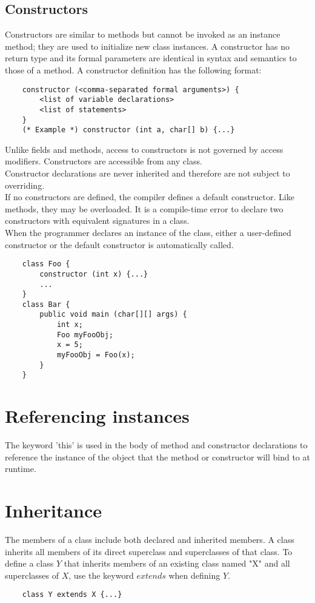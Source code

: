 \begin{homeworkProblem}
	\subsection{Constructors}
	Constructors are similar to methods but cannot be invoked as an instance method; they are used to initialize new class instances. A constructor has no return type and its formal parameters are identical in syntax and semantics to those of a method. A constructor definition has the following format:
	\begin{verbatim}
	constructor (<comma-separated formal arguments>) {
		<list of variable declarations>
		<list of statements>
	}
	(* Example *) constructor (int a, char[] b) {...}
	\end{verbatim}

	Unlike fields and methods, access to constructors is not governed by access modifiers. Constructors are accessible from any class.\\
	
	Constructor declarations are never inherited and therefore are not subject to overriding.\\
	
	If no constructors are defined, the compiler defines a default constructor. Like methods, they may be overloaded. It is a compile-time error to declare two constructors with equivalent signatures in a class.\\
	
	When the programmer declares an instance of the class, either a user-defined constructor or the default constructor is automatically called.
	\begin{verbatim}
	class Foo {
		constructor (int x) {...}
		...
	}
	class Bar {
		public void main (char[][] args) {
			int x; 
			Foo myFooObj;
			x = 5;
			myFooObj = Foo(x);
		}
	}
	\end{verbatim}
	
	\section{Referencing instances}
	The keyword 'this' is used in the body of method and constructor declarations to reference the instance of the object that the method or constructor will bind to at runtime.
	
	\section{Inheritance}
	The members of a class include both declared and inherited members. A class inherits all members of its direct superclass and superclasses of that class. To define a class $Y$ that inherits members of an existing class named "X" and all superclasses of $X$, use the keyword $extends$ when defining $Y$.
	\begin{verbatim}
	class Y extends X {...}
	\end{verbatim}	

\end{homeworkProblem}
